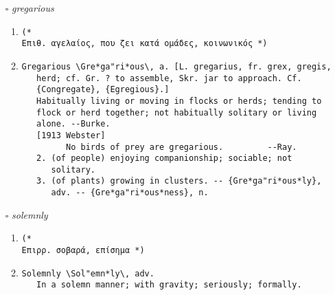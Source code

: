 \documentclass{article}
\begin{document}
\begin{itemize}
\begin{enumerate}
\item{
\begin{lstlisting}
(* 
διιστάμενος, που αποκλίνει, αντίθετος *)
\end{lstlisting}}
\item{
\begin{lstlisting}
Divergent \Di*ver"gent\, a. [Cf. F. divergent. See {Diverge}.]
   1. Receding farther and farther from each other, as lines
      radiating from one point; deviating gradually from a given
      direction; -- opposed to {convergent}.
      [1913 Webster]
   2. (Optics) Causing divergence of rays; as, a divergent lens.
      [1913 Webster]
   3. Fig.: Disagreeing from something given; differing; as, a
      divergent statement.
      [1913 Webster]
   {Divergent series}. (Math.) See {Diverging series}, under
      {Diverging}.
      [1913 Webster]
\end{lstlisting}}
\end{enumerate}
\item[$\square$] \emph{ gregarious }
\begin{enumerate}
\item{
\begin{lstlisting}
(* 
Επιθ. αγελαίος, που ζει κατά ομάδες, κοινωνικός *)
\end{lstlisting}}
\item{
\begin{lstlisting}
Gregarious \Gre*ga"ri*ous\, a. [L. gregarius, fr. grex, gregis,
   herd; cf. Gr. ? to assemble, Skr. jar to approach. Cf.
   {Congregate}, {Egregious}.]
   Habitually living or moving in flocks or herds; tending to
   flock or herd together; not habitually solitary or living
   alone. --Burke.
   [1913 Webster]
         No birds of prey are gregarious.         --Ray.
   2. (of people) enjoying companionship; sociable; not
      solitary.
   3. (of plants) growing in clusters. -- {Gre*ga"ri*ous*ly},
      adv. -- {Gre*ga"ri*ous*ness}, n.
\end{lstlisting}}
\end{enumerate}
\item[$\square$] \emph{ solemnly }
\begin{enumerate}
\item{
\begin{lstlisting}
(* 
Επιρρ. σοβαρά, επίσημα *)
\end{lstlisting}}
\item{
\begin{lstlisting}
Solemnly \Sol"emn*ly\, adv.
   In a solemn manner; with gravity; seriously; formally.

\end{lstlisting}}
\end{enumerate}
\end{itemize}
\end{document}
